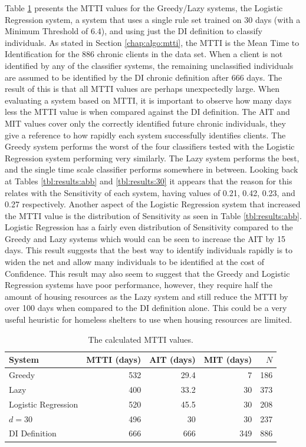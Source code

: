 Table \ref{tbl:results:mtti} presents the MTTI values for the Greedy/Lazy systems, the Logistic Regression system, a system that uses a single rule set trained on 30 days (with a Minimum Threshold of 6.4), and using just the DI definition to classify individuals.
As stated in Section \ref{chap:algo:mtti}, the MTTI is the Mean Time to Identification for the 886 chronic clients in the data set. When a client is not identified by any of the classifier systems, the remaining unclassified individuals are assumed to be identified by the DI chronic definition after 666 days. The result of this is that all MTTI values are perhaps unexpectedly large. When evaluating a system based on MTTI, it is important to observe how many days less the MTTI value is when compared against the DI definition. The AIT and MIT values cover only the correctly identified future chronic individuals, they give a reference to how rapidly each system successfully identifies clients.
The Greedy system performs the worst of the four classifiers tested with the Logistic Regression system performing very similarly. The Lazy system performs the best, and the single time scale classifier performs somewhere in between. Looking back at Tables \ref{tbl:results:abb} and \ref{tbl:results:30} it appears that the reason for this relates with the Sensitivity of each system, having values of 0.21, 0.42, 0.23, and 0.27 respectively.
Another aspect of the Logistic Regression system that increased the MTTI value is the distribution of Sensitivity as seen in Table \ref{tbl:results:abb}. Logistic Regression has a fairly even distribution of Sensitivity compared to the Greedy and Lazy systems which would can be seen to increase the AIT by 15 days. 
This result suggests that the best way to identify individuals rapidly is to widen the net and allow many individuals to be identified at the cost of Confidence.
This result may also seem to suggest that the Greedy and Logistic Regression systems have poor performance, however, they require half the amount of housing resources as the Lazy system and still reduce the MTTI by over 100 days when compared to the DI definition alone. This could be a very useful heuristic for homeless shelters to use when housing resources are limited.


\begin{table}[h]
	\centering

	\begin{tabular}{lrrrr}
	\toprule
	{System} &  MTTI (days) & AIT (days) & MIT (days) & $N$ \\
	\midrule
	Greedy & 532 & 29.4 & 7 & 186 \\
	Lazy & 400 & 33.2 & 30 & 373 \\
	Logistic Regression & 520 & 45.5 & 30 & 208 \\
	$d=30$ & 496 & 30 & 30 & 237 \\
	DI Definition & 666 & 666 & 349 & 886 \\

	\bottomrule
	\end{tabular}

	\caption{The calculated MTTI values.}
	\label{tbl:results:mtti}
\end{table}


